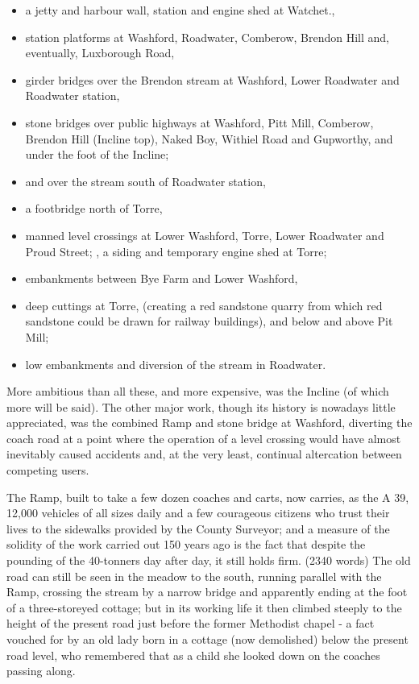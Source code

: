 \documentclass[11pt]{book}
\begin{document}
\begin{itemize}
\item a jetty and harbour wall, station and engine shed at Watchet., 
\item station platforms at Washford, Roadwater, Comberow, Brendon Hill  and, eventually, Luxborough Road, 
\item girder bridges over the Brendon stream at Washford, Lower Roadwater and Roadwater station, 
\item stone bridges over public highways at Washford, Pitt Mill, Comberow, Brendon Hill (Incline top), Naked Boy, Withiel Road and Gupworthy, and under the foot of the Incline; 
\item and over the stream south of  Roadwater station, 
\item a footbridge north of Torre,  
\item manned level crossings at Lower Washford, Torre, Lower Roadwater and  Proud Street; , a siding and temporary engine shed at Torre;
\item embankments between Bye Farm and Lower Washford, 
\item deep cuttings at Torre,  (creating a red sandstone quarry from which red sandstone could  be drawn for railway buildings), and below and above Pit Mill;   
\item low embankments and diversion of the stream in Roadwater.
\end{itemize}

More ambitious than all these, and more expensive, was the Incline (of which more will be said).  The other major work, though its history is  nowadays little appreciated, was the combined Ramp and stone bridge at Washford, diverting the coach road at a point where the operation of a  level crossing would have almost inevitably caused accidents and, at the very least, continual altercation between competing users. 

The Ramp, built to take a few dozen coaches and carts, now carries, as the A 39, 12,000 vehicles of all sizes daily and a few courageous citizens who trust their lives to the sidewalks provided by the County Surveyor; and a measure of the solidity of the work carried out 150 years ago is the fact that despite the pounding of the 40-tonners day after day, it still holds firm. (2340 words)  The old road can still be seen in the meadow to the south, running parallel with the Ramp, crossing the stream by a  narrow bridge and apparently ending at the foot of a three-storeyed cottage; but in its working life it then climbed steeply to the height of the present road just before the former Methodist chapel  - a fact vouched for by an old lady born in a cottage (now demolished) below the present road level, who remembered that as a child she looked down on the coaches passing along.
\end{document}

